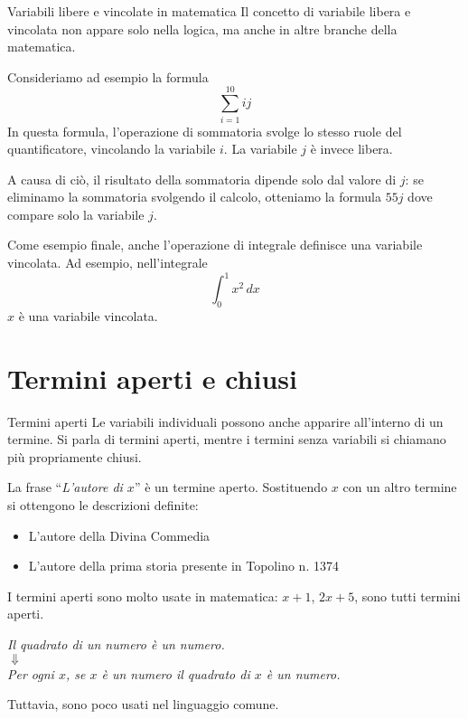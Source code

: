 \documentclass[10pt,dvipsnames]{beamer}
\begin{document}
\begin{frame}{Variabili libere e vincolate in matematica}
	Il concetto di variabile libera e vincolata non appare solo nella logica, ma anche in altre branche della matematica.

	\medskip Consideriamo ad esempio la formula
	\[
		\sum_{i=1}^{10} ij
	\]
	In questa formula, l'operazione di sommatoria svolge lo stesso ruole del quantificatore, vincolando la variabile $i$. La variabile $j$ è invece libera.

	\medskip
	A causa di ciò, il risultato della sommatoria dipende solo dal valore di $j$: se eliminamo la sommatoria svolgendo il calcolo, otteniamo la formula $55 j$ dove compare solo la variabile $j$.

	\medskip
	Come esempio finale, anche l'operazione di integrale definisce una variabile vincolata. Ad esempio, nell'integrale
	\[
		\int_0^1 x^2 \, dx
	\]
	$x$ è una variabile vincolata.
\end{frame}


\iffalse

\section{Termini aperti e chiusi}

\begin{frame}{Termini aperti}
	Le variabili individuali possono anche apparire all'interno di un termine. Si parla di \alert{termini aperti}, mentre i termini senza variabili si chiamano più propriamente \alert{chiusi}.
	\begin{example}
	La frase ``{\itshape L'autore di $x$}'' è un termine aperto. Sostituendo $x$ con un altro termine si ottengono le descrizioni definite:
	\begin{itemize}
		\itshape
		\item L'autore della Divina Commedia\\
		\item L'autore della prima storia presente in Topolino n. 1374
	\end{itemize}
	\end{example}
    I termini aperti sono molto usate in matematica: $x+1$, $2x+5$, sono tutti termini aperti.
    \begin{example}
        \itshape\centering
        Il quadrato di un numero è un numero.\\
        $\Downarrow$\\
        Per ogni $x$, se $x$ è un numero il quadrato di $x$ è un numero.
    \end{example}
    Tuttavia, sono poco usati nel linguaggio comune.

\end{frame}
\end{document}
